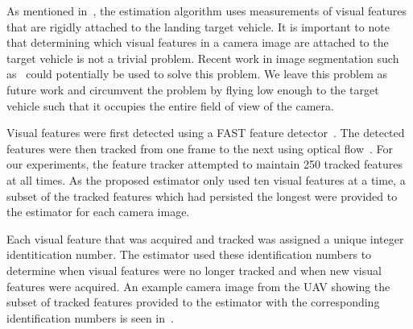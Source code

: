 
As mentioned in~,
the estimation algorithm uses measurements of visual features that are
rigidly attached to the landing target vehicle. It is important to note that
determining which visual features in a camera image are attached to
the target vehicle is not a trivial problem.
Recent work in image segmentation such as~\cite{jia2019sequential} could
potentially be used to solve this problem.
We leave this problem as future work and
circumvent the problem by flying low enough to the target vehicle such that it
occupies the entire field of view of the camera.


Visual features were first detected using a FAST feature
detector~\cite{rosten2006machine}. The detected features were then tracked from one frame to
the next using optical flow~\cite{bouguet2001pyramidal}.
For our experiments, the feature tracker attempted to maintain 250
tracked features at all times. As the proposed estimator only used ten visual
features at a time,
a subset of the tracked features which had persisted the longest
were provided to the estimator for each camera image.

Each visual feature that was acquired and tracked was assigned a unique integer
identitication number. The estimator used these identification numbers to
determine when visual features were no longer tracked and when new visual
features were acquired.
An example camera image from the UAV showing the
subset of tracked features provided to the estimator with the corresponding
identification
numbers is seen in~.


